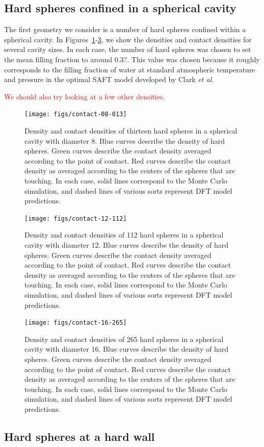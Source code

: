 \documentclass[letterpaper,twocolumn,amsmath,amssymb,prb]{revtex4-1}
\begin{document}
\subsection{Hard spheres confined in a spherical cavity}

The first geometry we consider is a number of hard spheres confined
within a spherical cavity.  In
Figures~\ref{fig:sphere-8}-\ref{fig:sphere-16}, we show
the densities and contact densities for several cavity sizes.  In each
case, the number of hard spheres was chosen to set the mean filling
fraction to around 0.3?.  This value was chosen because it roughly
corresponds to the filling fraction of water at standard atmospheric
temperature and pressure in the optimal SAFT model developed by Clark
\emph{et al}\cite{clark2006developing}.

\textcolor{red}{We should also try looking at a few other densities.}

\newcommand\sphereExplanation{ Blue curves describe the density of
  hard spheres.  Green curves describe the contact density averaged
  according to the point of contact.  Red curves describe the contact
  density as averaged according to the centers of the spheres that are
  touching.  In each case, solid lines correspond to the Monte Carlo
  simulation, and dashed lines of various sorts represent DFT model
  predictions.  }

\begin{figure}
  \texttt{[image: figs/contact-08-013]}
  \caption{Density and contact densities of thirteen hard spheres in a
    spherical cavity with diameter 8. \sphereExplanation }
  \label{fig:sphere-8}
\end{figure}

\begin{figure}
  \texttt{[image: figs/contact-12-112]}
  \caption{Density and contact densities of 112 hard spheres in a
    spherical cavity with diameter 12.  \sphereExplanation}
  \label{fig:sphere-12}
\end{figure}

\begin{figure}
  \texttt{[image: figs/contact-16-265]}
  \caption{Density and contact densities of 265 hard spheres in a
    spherical cavity with diameter 16. \sphereExplanation}
  \label{fig:sphere-16}
\end{figure}

\subsection{Hard spheres at a hard wall}
\end{document}
